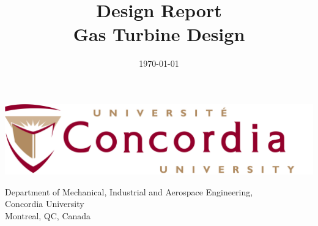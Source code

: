 \begingroup
\let\newpage\relax 
\title{\huge{{Design Report\\ \textbf{Gas Turbine Design}}}}
\vspace{200pt}
\date{\today}
\maketitle
\thispagestyle{empty}
\endgroup 

\vspace{90pt}
\begin{center}
  
\end{center}
\vspace{20pt}
\begin{center}
\includegraphics[scale=0.04]{figures/logo.png}
\end{center}
\begin{center}
\large Department of Mechanical, Industrial and Aerospace Engineering, \\ Concordia University \\ Montreal, QC, Canada
\end{center}
\clearpage



